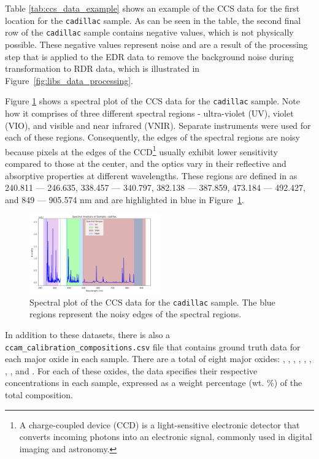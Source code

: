 Table \ref{tab:ccs_data_example} shows an example of the CCS data for the first location for the \texttt{cadillac} sample.
As can be seen in the table, the second final row of the \texttt{cadillac} sample contains negative values, which is not physically possible.
These negative values represent noise and are a result of the processing step that is applied to the EDR data to remove the background noise during transformation to RDR data, which is illustrated in Figure~\ref{fig:libs_data_processing}.

Figure \ref{fig:masked_regions} shows a spectral plot of the CCS data for the \texttt{cadillac} sample.
Note how it comprises of three different spectral regions - ultra-violet (UV), violet (VIO), and visible and near infrared (VNIR).
Separate instruments were used for each of these regions.
Consequently, the edges of the spectral regions are noisy because pixels at the edges of the CCD\footnote{A charge-coupled device (CCD) is a light-sensitive electronic detector that converts incoming photons into an electronic signal, commonly used in digital imaging and astronomy\cite{radionuclide_imaging}.} usually exhibit lower sensitivity compared to those at the center, and the optics vary in their reflective and absorptive properties at different wavelengths.
These regions are defined in \citet{cleggRecalibrationMarsScience2017} as 240.811 --- 246.635, 338.457 --- 340.797, 382.138 --- 387.859, 473.184 --- 492.427, and 849 --- 905.574 nm and are highlighted in blue in Figure~\ref{fig:masked_regions}.

\begin{figure}
	\centering
	\includegraphics[width=0.5\textwidth]{images/masked_regions.png}
	\caption{Spectral plot of the CCS data for the \texttt{cadillac} sample. The blue regions represent the noisy edges of the spectral regions.}
	\label{fig:masked_regions}
\end{figure}

In addition to these datasets, there is also a \\ \texttt{ccam\_calibration\_compositions.csv} file that contains ground truth data for each major oxide in each sample.
There are a total of eight major oxides: , , , , , , , , and .
For each of these oxides, the data specifies their respective concentrations in each sample, expressed as a weight percentage (wt. \%) of the total composition.
